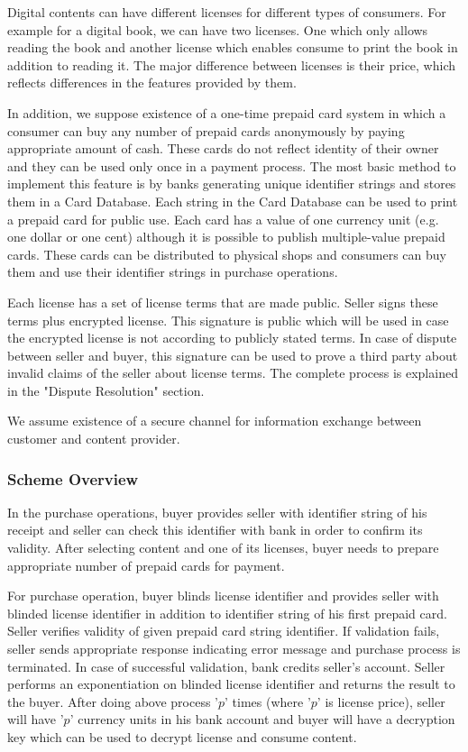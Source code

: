 \documentclass[times]{secauth}
\begin{document}
Digital contents can have different licenses for different types of consumers. For example for a digital book, we can have two licenses. One which only allows reading the book and another license which enables consume to print the book in addition to reading it. The major difference between licenses is their price, which reflects differences in the features provided by them.

In addition, we suppose existence of a one-time prepaid card system in which a consumer can buy any number of prepaid cards anonymously by paying appropriate amount of cash.
These cards do not reflect identity of their owner and they can be used only once in a payment process. The most basic method to implement this feature is by banks generating unique identifier strings and stores them in a Card Database. Each string in the Card Database can be used to print a prepaid card for public use. Each card has a value of one currency unit (e.g. one dollar or one cent) although it is possible to publish multiple-value prepaid cards. These cards can be distributed to physical shops and consumers can buy them and use their identifier strings in purchase operations.

Each license has a set of license terms that are made public. Seller signs these terms plus encrypted license. This signature is public which will be used in case the encrypted license is not according to publicly stated terms. In case of dispute between seller and buyer, this signature can be used to prove a third party about invalid claims of the seller about license terms. The complete process is explained in the "Dispute Resolution" section.

We assume existence of a secure channel for information exchange between customer and content provider.


\subsubsection{Scheme Overview}
In the purchase operations, buyer provides seller with identifier string of his receipt and seller can check this identifier with bank in order to confirm its validity.
After selecting content and one of its licenses, buyer needs to prepare appropriate number of prepaid cards for payment. 

For purchase operation, buyer blinds license identifier and provides seller with blinded license identifier in addition to identifier string of his first prepaid card. 
Seller verifies validity of given prepaid card string identifier. If validation fails, seller sends appropriate response indicating error message and purchase process is terminated. In case of successful validation, bank credits seller's account. Seller performs an exponentiation on blinded license identifier and returns the result to the buyer.
After doing above process '$p$' times (where '$p$' is license price), seller will have '$p$' currency units in his bank account and buyer will have a decryption key which can be used to decrypt license and consume content.
\end{document}
